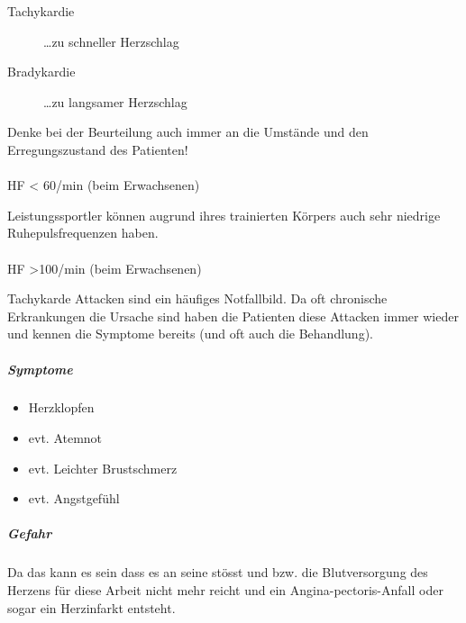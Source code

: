 \begin{description}
    \item[Tachykardie] \ldots zu schneller
    Herzschlag
    \item[Bradykardie] \ldots zu langsamer Herzschlag
\end{description}

Denke bei der Beurteilung auch immer an die Umstände und den
Erregungszustand des Patienten!

\paragraph{}
HF {\textless} 60/min (beim Erwachsenen)

Leistungssportler können augrund ihres trainierten Körpers auch sehr
niedrige Ruhepulsfrequenzen haben. 

\paragraph{}
HF {\textgreater}100/min (beim Erwachsenen)

Tachykarde Attacken sind ein häufiges Notfallbild. Da oft chronische
Erkrankungen die Ursache sind  haben die Patienten diese Attacken immer
wieder und kennen die Symptome bereits (und oft auch die Behandlung). 

\subparagraph{Symptome}

\begin{itemize}
    \item Herzklopfen
    \item evt. Atemnot
    \item evt. Leichter Brustschmerz
    \item evt. Angstgefühl
\end{itemize}

\subparagraph{Gefahr}

Da das  kann es sein dass es an seine 
stösst und  bzw. die Blutversorgung
des Herzens für diese Arbeit nicht mehr reicht und ein
Angina-pectoris-Anfall oder sogar ein Herzinfarkt entsteht.

